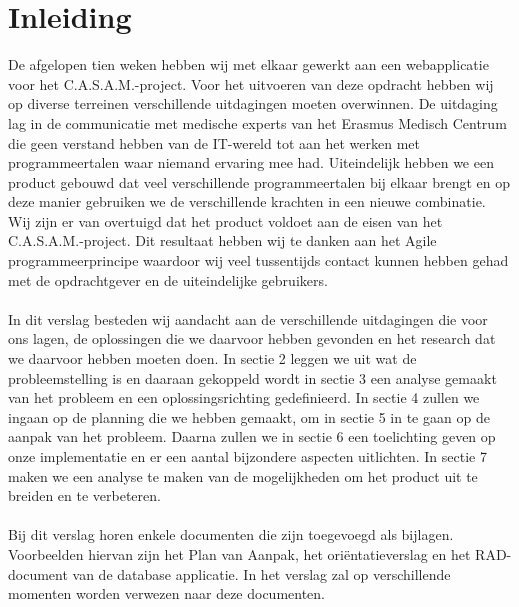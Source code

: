 \chapter{Inleiding}
\label{inleiding}
De afgelopen tien weken hebben wij met elkaar gewerkt aan een webapplicatie voor het C.A.S.A.M.-project. 
Voor het uitvoeren van deze opdracht hebben wij op diverse terreinen verschillende uitdagingen moeten overwinnen. 
De uitdaging lag in de communicatie met medische experts van het Erasmus Medisch Centrum die geen verstand hebben van de IT-wereld tot aan het werken met programmeertalen waar niemand ervaring mee had. 
Uiteindelijk hebben we een product gebouwd dat veel verschillende programmeertalen bij elkaar brengt en op deze manier gebruiken we de verschillende krachten in een nieuwe combinatie. 
Wij zijn er van overtuigd dat het product voldoet aan de eisen van het C.A.S.A.M.-project. 
Dit resultaat hebben wij te danken aan het Agile programmeerprincipe waardoor wij veel tussentijds contact kunnen hebben gehad met de opdrachtgever en de uiteindelijke gebruikers.
\\
\\
In dit verslag besteden wij aandacht aan de verschillende uitdagingen die voor ons lagen, de oplossingen die we daarvoor hebben gevonden en het research dat we daarvoor hebben moeten doen. 
In sectie 2 leggen we uit wat de probleemstelling is en daaraan gekoppeld wordt in sectie 3 een analyse gemaakt van het probleem en een oplossingsrichting gedefinieerd. 
In sectie 4 zullen we ingaan op de planning die we hebben gemaakt, om in sectie 5 in te gaan op de aanpak van het probleem. 
Daarna zullen we in sectie 6 een toelichting geven op onze implementatie en er een aantal bijzondere aspecten uitlichten. 
In sectie 7 maken we een analyse te maken van de mogelijkheden om het product uit te breiden en te verbeteren. 
\\
\\
Bij dit verslag horen enkele documenten die zijn toegevoegd als bijlagen. 
Voorbeelden hiervan zijn het Plan van Aanpak, het ori\"{e}ntatieverslag en het RAD-document van de database applicatie. 
In het verslag zal op verschillende momenten worden verwezen naar deze documenten. 
